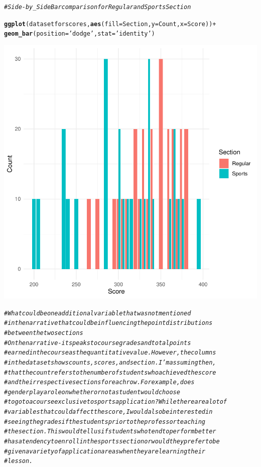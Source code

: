 \documentclass{article}\usepackage[]{graphicx}\usepackage[]{xcolor}
\makeatletter
\newcommand{\hlstr}[1]{\textcolor[rgb]{0.192,0.494,0.8}{#1}}%
\newcommand{\hlcom}[1]{\textcolor[rgb]{0.678,0.584,0.686}{\textit{#1}}}%
\newcommand{\hlopt}[1]{\textcolor[rgb]{0,0,0}{#1}}%
\newcommand{\hlstd}[1]{\textcolor[rgb]{0.345,0.345,0.345}{#1}}%
\newcommand{\hlkwc}[1]{\textcolor[rgb]{0.333,0.667,0.333}{#1}}%
\newcommand{\hlkwd}[1]{\textcolor[rgb]{0.737,0.353,0.396}{\textbf{#1}}}%
\newenvironment{kframe}{%
 \def\at@end@of@kframe{}%
 \ifinner\ifhmode%
  \def\at@end@of@kframe{\end{minipage}}%
  \begin{minipage}{\columnwidth}%
 \fi\fi%
 \def\FrameCommand##1{\hskip\@totalleftmargin \hskip-\fboxsep
 \colorbox{shadecolor}{##1}\hskip-\fboxsep
     \hskip-\linewidth \hskip-\@totalleftmargin \hskip\columnwidth}%
 \MakeFramed {\advance\hsize-\width
   \@totalleftmargin\z@ \linewidth\hsize
   \@setminipage}}%
 {\par\unskip\endMakeFramed%
 \at@end@of@kframe}
\newenvironment{knitrout}{}{} %
\makeatother
\begin{document}
\begin{knitrout}
{}


\begin{kframe}\begin{alltt}
\hlcom{#Side-by_Side Bar comparison for Regular and Sports Section}


\hlkwd{ggplot}\hlstd{(datasetforscores,} \hlkwd{aes}\hlstd{(}\hlkwc{fill}\hlstd{=Section,}\hlkwc{y}\hlstd{=Count,}\hlkwc{x}\hlstd{=Score))} \hlopt{+}
  \hlkwd{geom_bar}\hlstd{(}\hlkwc{position} \hlstd{=} \hlstr{'dodge'}\hlstd{,} \hlkwc{stat}\hlstd{=}\hlstr{'identity'}\hlstd{)}
\end{alltt}
\end{kframe}

{\centering \includegraphics[width=.6\linewidth]{figure/week4-assignment-01-Couto-Maria-Rnwauto-report-6} 

}


\begin{kframe}\begin{alltt}
\hlcom{# What could be one additional variable that was not mentioned }
\hlcom{# in the narrative that could be influencing the point distributions }
\hlcom{# between the two sections}
\hlcom{# On the narrative- it speaks to  course grades and total points }
\hlcom{# earned in the course as the quantitative value. However, the columns}
\hlcom{# in the dataset shows counts, scores, and section. I'm assuming then, }
\hlcom{# that the count refers to the number of students who achieved the score}
\hlcom{# and their respective sections for each row. For example, does}
\hlcom{# gender play a role on whether or not a student would choose}
\hlcom{# to go to a course exclusive to sports application? While there are a lot of}
\hlcom{# variables that could affect the score, I would also be interested in }
\hlcom{# seeing the grades if the students prior to the professor teaching}
\hlcom{# the section. This would tell us if students who tend to perform better}
\hlcom{# has a tendency to enroll in the sports section or would they prefer to be}
\hlcom{# given a variety of application areas when they are learning their}
\hlcom{# lesson. }
\end{alltt}
\end{kframe}
\end{knitrout}
\end{document}
